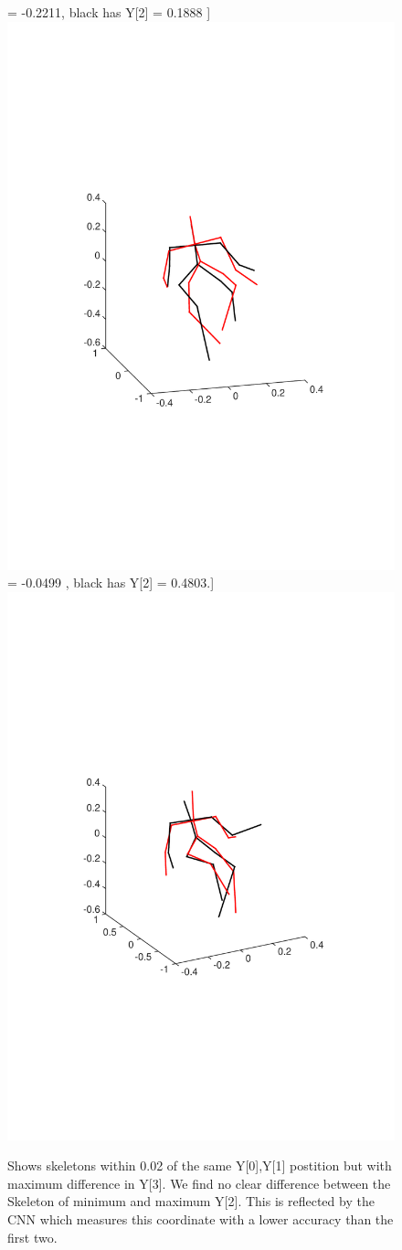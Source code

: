 \documentclass[11pt]{article} %
\begin{document}
\begin{figure}
\centering
\subfloat[Red skeleton has Y[2] = -0.2211, black has Y[2] = 0.1888\label{fig:-1.165-0.6517} ]{{
\includegraphics*[trim={3cm 8cm 3cm 8cm},clip,width=0.45\linewidth,clip]{-1_165-0_6517} }}%
\qquad
\subfloat[Red skeleton has Y[2] = -0.0499 , black has Y[2] = 0.4803.\label{fig:0.9485,-0.1622}]{{
\includegraphics*[trim={3cm 8cm 3cm 8cm},clip,width=0.45\linewidth,clip]{0_9485,-0_1622} }}%
\caption{Shows skeletons within 0.02 of the same Y[0],Y[1] postition but with maximum difference in Y[3]. We find no clear difference between the Skeleton of minimum and maximum Y[2]. This is reflected by the CNN which measures this coordinate with a lower accuracy than the first two.}
\label{fig:skelsZcomp}
\end{figure}
\end{document}

